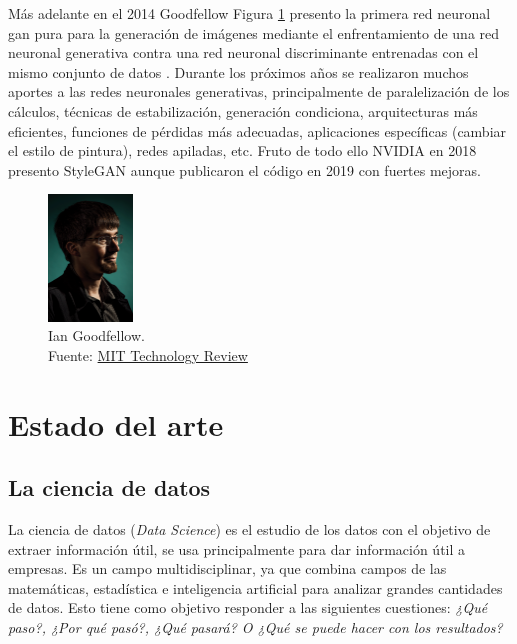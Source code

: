 Más adelante en el 2014 {Goodfellow} Figura \ref{fig:gan-ian-goodfellow} presento la primera red neuronal \acrshort{gan} pura para la generación de imágenes mediante el enfrentamiento de una red neuronal generativa contra una red neuronal discriminante entrenadas con el mismo conjunto de datos \cite{goodfellow2014generative}.
Durante los próximos años se realizaron muchos aportes a las redes neuronales generativas, principalmente de paralelización de los cálculos, técnicas de estabilización, generación condiciona, arquitecturas más eficientes, funciones de pérdidas más adecuadas, aplicaciones específicas (cambiar el estilo de pintura), redes apiladas, etc.
Fruto de todo ello {NVIDIA} en 2018 presento \gls{StyleGAN} \cite{karras2019stylebased} aunque publicaron el código en 2019 con fuertes mejoras.

\begin{figure}[H]
    \centering
    \includegraphics[width=0.2\textwidth]{figures/gan-goodfellow.png}
    \caption{Ian Goodfellow.\\Fuente: \href{https://www.technologyreview.es/s/10016/el-senor-de-las-gan-el-hombre-que-dio-imaginacion-las-maquinas}{MIT Technology Review}}
    \label{fig:gan-ian-goodfellow}
\end{figure}


\section{Estado del arte}
\label{ch:2:section:state-of-the-art}

\subsection{La ciencia de datos}
La ciencia de datos (\textit{Data Science}) es el estudio de los datos con el objetivo de extraer información útil, se usa principalmente para dar información útil a empresas. Es un campo multidisciplinar, ya que combina campos de las matemáticas, estadística e inteligencia artificial para analizar grandes cantidades de datos. Esto tiene como objetivo responder a las siguientes cuestiones: \textit{¿Qué paso?, ¿Por qué pasó?, ¿Qué pasará? O ¿Qué se puede hacer con los resultados?} \cite{aws-data-science}

